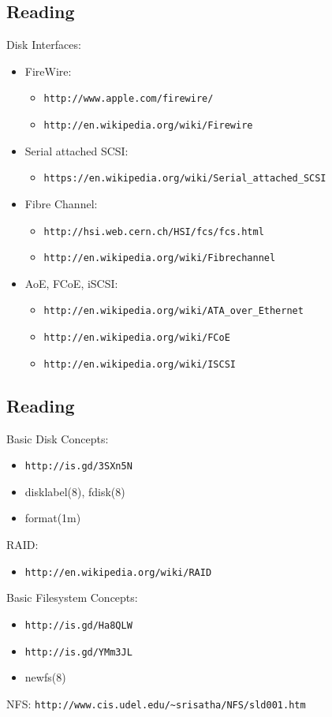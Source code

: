 \documentclass[xga]{xdvislides}
\begin{document}
\subsection{Reading}
Disk Interfaces:
\begin{itemize}
	\item FireWire:
		\begin{itemize}
			\item \verb+http://www.apple.com/firewire/+
			\item \verb+http://en.wikipedia.org/wiki/Firewire+
		\end{itemize}
	\item Serial attached SCSI:
		\begin{itemize}
			\item \verb+https://en.wikipedia.org/wiki/Serial_attached_SCSI+
		\end{itemize}
	\item Fibre Channel:
		\begin{itemize}
			\item \verb+http://hsi.web.cern.ch/HSI/fcs/fcs.html+
			\item \verb+http://en.wikipedia.org/wiki/Fibrechannel+
		\end{itemize}
	\item AoE, FCoE, iSCSI:
		\begin{itemize}
			\item \verb+http://en.wikipedia.org/wiki/ATA_over_Ethernet+
			\item \verb+http://en.wikipedia.org/wiki/FCoE+
			\item \verb+http://en.wikipedia.org/wiki/ISCSI+
		\end{itemize}
\end{itemize}

\subsection{Reading}
Basic Disk Concepts:
\begin{itemize}
	\item \verb+http://is.gd/3SXn5N+
	\item disklabel(8), fdisk(8)
	\item format(1m)
\end{itemize}
RAID:
\begin{itemize}
	\item \verb+http://en.wikipedia.org/wiki/RAID+
\end{itemize}
Basic Filesystem Concepts:
\begin{itemize}
	\item \verb+http://is.gd/Ha8QLW+
	\item \verb+http://is.gd/YMm3JL+
	\item newfs(8)
\end{itemize}
NFS: \verb+http://www.cis.udel.edu/~srisatha/NFS/sld001.htm+
\end{document}
